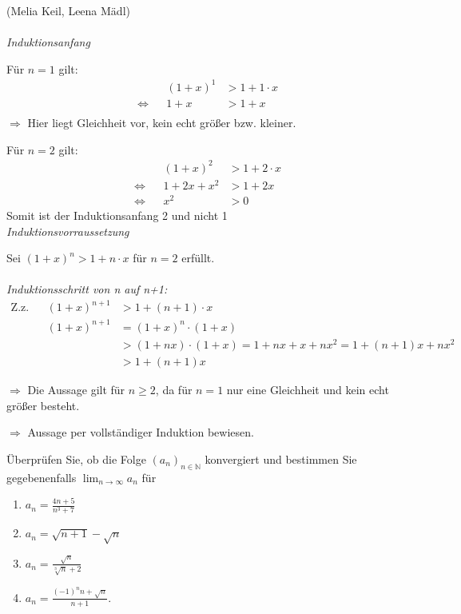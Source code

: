 \begin{lsg} (Melia Keil, Leena Mädl)\\
\\
    \emph{Induktionsanfang}

    Für $n=1$ gilt:
    \begin{align*}
        &&(1+x)^1&>1+1\cdot x\\
        \iff &&1+x&>1+x\\
    \end{align*}
    $\Longrightarrow$ Hier liegt Gleichheit vor, kein echt größer bzw. kleiner.

    Für $n=2$ gilt:
    \begin{align*}
        &&(1+x)^2&>1+2\cdot x\\
        \iff &&1+2x+x^2&>1+2x\\
        \iff &&x^2&>0
    \end{align*}
   Somit ist der Induktionsanfang 2 und nicht 1
   \\ 
    
    \emph{Induktionsvorraussetzung}

    Sei $(1+x)^n> 1+n\cdot x$ für $n=2$ erfüllt.\\
    \\
    \emph{Induktionsschritt von n auf n+1:}
    \begin{align*}
       \text{Z.z.} &&(1+x)^{n+1}&>1+(n+1)\cdot x\\
        &&(1+x)^{n+1}&=(1+x)^n\cdot (1+x)\\
        && &>(1+nx)\cdot(1+x)=1+nx+x+nx^2=1+(n+1)x+nx^2\\
        && &>1+(n+1)x
    \end{align*}
    
    $\Longrightarrow$ Die Aussage gilt für $n\geq2$, da für $n=1$ nur eine Gleichheit und kein echt größer besteht.
    
     $\Longrightarrow$ Aussage per vollständiger Induktion bewiesen.

\end{lsg}


\bigskip


\begin{aufg}[6 Punkte]
\"Uberpr\"ufen Sie, ob die Folge $ (a_{n})_{n\in \mathbb{N}} $ konvergiert und bestimmen Sie gegebenenfalls $\lim_{n\to\infty} a_{n} $ f\"ur 
\begin{enumerate}[label=$\mathrm{(\roman*)}$, ref=$\mathrm{\roman*}$]
\setlength{\itemsep}{2pt}
\item $a_{n} = \frac{4n + 5}{n^{3}+7}$
\item $a_{n} = \sqrt{n+1} - \sqrt{n}$
\item $a_{n} = \frac{\sqrt{n}}{\sqrt[3]{n}+2}$
\item $a_{n} = \frac{(-1)^{n}n + \sqrt{n}}{n+1}$.
\end{enumerate}
\end{aufg}


